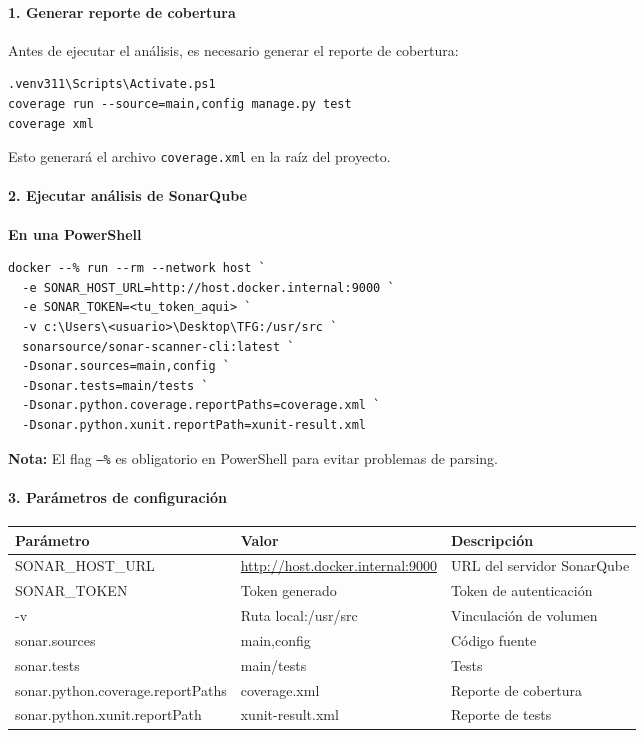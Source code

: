 \paragraph*{1. Generar reporte de cobertura}

Antes de ejecutar el análisis, es necesario generar el reporte de cobertura:

\begin{verbatim}
.venv311\Scripts\Activate.ps1
coverage run --source=main,config manage.py test
coverage xml
\end{verbatim}

Esto generará el archivo \texttt{coverage.xml} en la raíz del proyecto.

\paragraph*{2. Ejecutar análisis de SonarQube}

\textbf{En una PowerShell}

\begin{verbatim}
docker --% run --rm --network host `
  -e SONAR_HOST_URL=http://host.docker.internal:9000 `
  -e SONAR_TOKEN=<tu_token_aqui> `
  -v c:\Users\<usuario>\Desktop\TFG:/usr/src `
  sonarsource/sonar-scanner-cli:latest `
  -Dsonar.sources=main,config `
  -Dsonar.tests=main/tests `
  -Dsonar.python.coverage.reportPaths=coverage.xml `
  -Dsonar.python.xunit.reportPath=xunit-result.xml
\end{verbatim}

\textbf{Nota:} El flag \texttt{--\%} es obligatorio en PowerShell para evitar problemas de parsing.

\paragraph*{3. Parámetros de configuración}
\begin{table}[h]
\centering
\begin{tabularx}{\textwidth}{|l|>{\raggedright\arraybackslash}X|>{\raggedright\arraybackslash}X|}
\hline
\textbf{Parámetro} & \textbf{Valor} & \textbf{Descripción} \\
\hline
SONAR\_HOST\_URL & \url{http://host.docker.internal:9000} & URL del servidor SonarQube \\
\hline
SONAR\_TOKEN & Token generado & Token de autenticación \\
\hline
-v & Ruta local:/usr/src & Vinculación de volumen \\
\hline
sonar.sources & main,config & Código fuente \\
\hline
sonar.tests & main/tests & Tests \\
\hline
sonar.python.coverage.reportPaths & coverage.xml & Reporte de cobertura \\
\hline
sonar.python.xunit.reportPath & xunit-result.xml & Reporte de tests \\
\hline
\end{tabularx}
\end{table}

